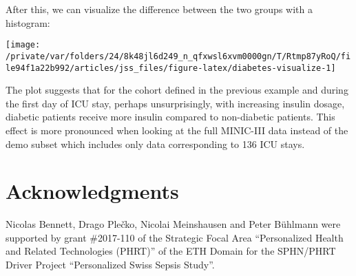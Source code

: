 \documentclass[
  notitle]{jss}
\begin{document}
\begin{CodeChunk}
\begin{CodeInput}
R> grep_diab <- function(x) grepl("^250\\.?[0-9]{2}$", x)
R> 
R> diab  <- item(src, table = "diagnoses_icd",
+               callback = transform_fun(grep_diab), class = "col_itm")
R> diab  <- concept("diab", diab, "diabetes", target = "id_tbl",
+                  class = "lgl_cncpt")
R> 
R> dat <- load_concepts(c(ins24, diab), id_type = "icustay", verbose = FALSE)
R> dat <- replace_na(dat, "[0,1)", vars = "ins24")
R> 
R> dat
\end{CodeInput}
\end{CodeChunk}

After this, we can visualize the difference between the two groups with
a histogram:

\begin{CodeChunk}


\begin{center}\texttt{[image: /private/var/folders/24/8k48jl6d249\_n\_qfxwsl6xvm0000gn/T/Rtmp87yRoQ/file94f1a22b992/articles/jss\_files/figure-latex/diabetes-visualize-1]} \end{center}

\end{CodeChunk}

The plot suggests that for the cohort defined in the previous example
and during the first day of ICU stay, perhaps unsurprisingly, with
increasing insulin dosage, diabetic patients receive more insulin
compared to non-diabetic patients. This effect is more pronounced when
looking at the full MINIC-III data instead of the demo subset which
includes only data corresponding to 136 ICU stays.

\hypertarget{acknowledgments}{%
\section{Acknowledgments}\label{acknowledgments}}

Nicolas Bennett, Drago Plečko, Nicolai Meinshausen and Peter Bühlmann
were supported by grant \#2017-110 of the Strategic Focal Area
``Personalized Health and Related Technologies (PHRT)'' of the ETH
Domain for the SPHN/PHRT Driver Project ``Personalized Swiss Sepsis
Study''.


\end{document}
